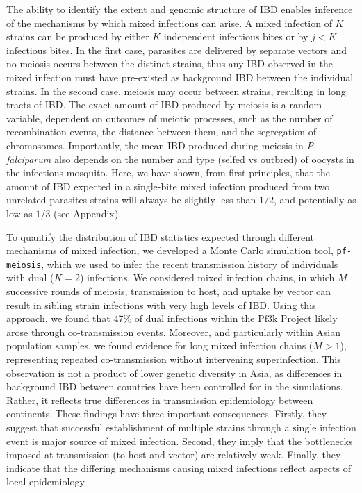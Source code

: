 \documentclass[9pt,lineno]{elife}
\begin{document}
The ability to identify the extent and genomic structure of IBD enables inference of the mechanisms by which mixed infections can arise.  A mixed infection of $K$ strains can be produced by either $K$ independent infectious bites or by $j < K$ infectious bites. In the first case, parasites are delivered by separate vectors and no meiosis occurs between the distinct strains, thus any IBD observed in the mixed infection must have pre-existed as background IBD between the individual strains.  In the second case, meiosis may occur between strains, resulting in long tracts of IBD.  The exact amount of IBD produced by meiosis is a random variable, dependent on outcomes of meiotic processes, such as the number of recombination events, the distance between them, and the segregation of chromosomes.  Importantly, the mean IBD produced during meiosis in \textit{P. falciparum} also depends on the number and type (selfed vs outbred) of oocysts in the infectious mosquito.  Here, we have shown, from first principles, that the amount of IBD expected in a single-bite mixed infection produced from two unrelated parasites strains will always be slightly less than $1/2$, and potentially as low as $1/3$ (see Appendix).

To quantify the distribution of IBD statistics expected through different mechanisms of mixed infection, we developed a Monte Carlo simulation tool, \texttt{pf-meiosis}, which we used to infer the recent transmission history of individuals with dual ($K=2$) infections.  We considered mixed infection chains, in which $M$ successive rounds of meiosis, transmission to host, and uptake by vector can result in sibling strain infections with very high levels of IBD.  Using this approach, we found that 47\% of dual infections within the Pf3k Project likely arose through co-transmission events. Moreover, and particularly within Asian population samples, we found evidence for long mixed infection chains ($M>1$), representing repeated co-transmission without intervening superinfection.  This observation is not a product of lower genetic diversity in Asia, as differences in background IBD between countries have been controlled for in the simulations. Rather, it reflects true differences in transmission epidemiology between continents. These findings have three important consequences. Firstly, they suggest that successful establishment of multiple strains through a single infection event is major source of mixed infection.  Second, they imply that the bottlenecks imposed at transmission (to host and vector) are relatively weak.  Finally, they indicate that the differing mechanisms causing mixed infections reflect aspects of local epidemiology.
\end{document}
